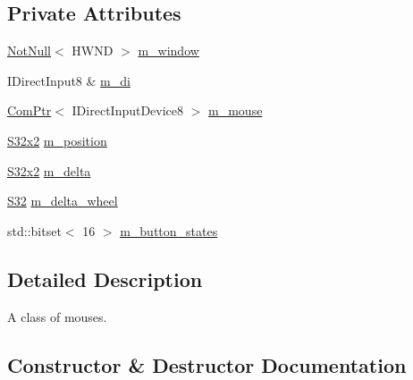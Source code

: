 \subsection*{Private Attributes}
\begin{DoxyCompactItemize}
\item 
\mbox{\hyperlink{namespacemage_a8769f9d670d6b585ea306cb1062af94b}{Not\+Null}}$<$ H\+W\+ND $>$ \mbox{\hyperlink{classmage_1_1input_1_1_mouse_a9fc088bd15bc89c9791642e4a95e81bc}{m\+\_\+window}}
\item 
I\+Direct\+Input8 \& \mbox{\hyperlink{classmage_1_1input_1_1_mouse_a35e656946a3cbb7253abaeeec30642df}{m\+\_\+di}}
\item 
\mbox{\hyperlink{namespacemage_ae74f374780900893caa5555d1031fd79}{Com\+Ptr}}$<$ I\+Direct\+Input\+Device8 $>$ \mbox{\hyperlink{classmage_1_1input_1_1_mouse_acce273ae24a5f7ba107f2f15618bbea6}{m\+\_\+mouse}}
\item 
\mbox{\hyperlink{namespacemage_a4843c424aae7bb5fb6c440ed6ed593ee}{S32x2}} \mbox{\hyperlink{classmage_1_1input_1_1_mouse_a240e60291f97e6b281d11cfd52d38e53}{m\+\_\+position}}
\item 
\mbox{\hyperlink{namespacemage_a4843c424aae7bb5fb6c440ed6ed593ee}{S32x2}} \mbox{\hyperlink{classmage_1_1input_1_1_mouse_ac2e7872b793012d52c9f1b1b1206f6d6}{m\+\_\+delta}}
\item 
\mbox{\hyperlink{namespacemage_a2ef1a005a77358f1825d13fd481b557f}{S32}} \mbox{\hyperlink{classmage_1_1input_1_1_mouse_ab71a69d6a727b67065643d5dc929ee33}{m\+\_\+delta\+\_\+wheel}}
\item 
std\+::bitset$<$ 16 $>$ \mbox{\hyperlink{classmage_1_1input_1_1_mouse_a7a11cd8de9e8dda4ef40c31670b04b00}{m\+\_\+button\+\_\+states}}
\end{DoxyCompactItemize}


\subsection{Detailed Description}
A class of mouses. 

\subsection{Constructor \& Destructor Documentation}
\mbox{\label{classmage_1_1input_1_1_mouse_add3fd231e5af4f3669eaa8d5f8d157ec}} 
